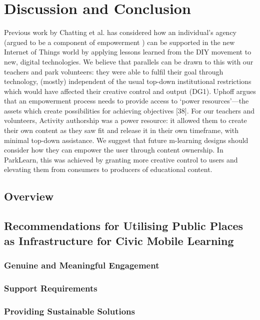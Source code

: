 \chapter{Discussion and Conclusion}

Previous work by Chatting et al. \citep{Chatting2017} has considered how an individual’s agency (argued to be a component of empowerment \citep{Ibrahim2007}) can be supported in the new Internet of Things world by applying lessons learned from the DIY movement to new, digital technologies. We believe that parallels can be drawn to this with our teachers and park volunteers: they were able to fulfil their goal through technology, (mostly) independent of the usual top-down institutional restrictions which would have affected their creative control and output (DG1). Uphoff argues that an empowerment process needs to provide access to ‘power resources’—the assets which create possibilities for achieving objectives [38]. For our teachers and volunteers, Activity authorship was a power resource: it allowed them to create their own content as they saw fit and release it in their own timeframe, with minimal top-down assistance. We suggest that future m-learning designs should consider how they can empower the user through content ownership. In ParkLearn, this was achieved by granting more creative control to users and elevating them from consumers to producers of educational content.

\section{Overview}

\section{Recommendations for Utilising Public Places as Infrastructure for Civic Mobile Learning}

\subsection{Genuine and Meaningful Engagement}
\subsection{Support Requirements}
\subsection{Providing Sustainable Solutions}